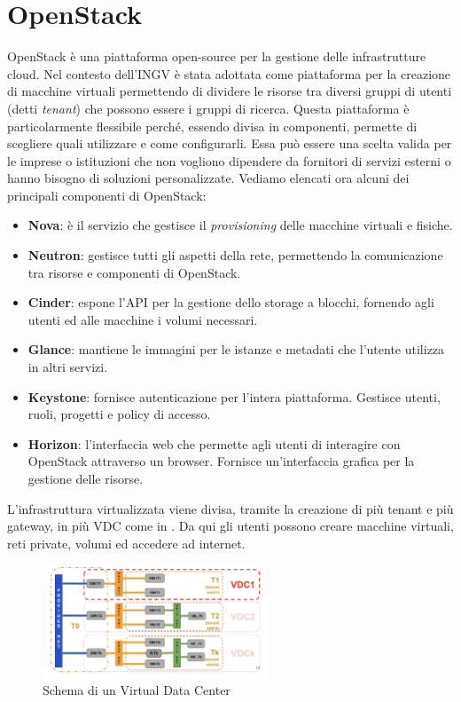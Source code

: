 \documentclass[12pt,a4paper,openright,twoside]{book}
\begin{document}
\section{OpenStack}
OpenStack è una piattaforma open-source per la gestione delle infrastrutture cloud. Nel contesto dell'INGV è stata adottata come piattaforma per la creazione di
macchine virtuali permettendo di dividere le risorse tra diversi gruppi di utenti (detti \textit{tenant}) che possono essere i gruppi di ricerca.
Questa piattaforma è particolarmente flessibile perché, essendo divisa in componenti, permette di scegliere quali utilizzare e come configurarli. Essa può essere
una scelta valida per le imprese o istituzioni che non vogliono dipendere da fornitori di servizi esterni o hanno bisogno di soluzioni personalizzate.
Vediamo elencati ora alcuni dei principali componenti di OpenStack\cite{amslaurea29330}:
\begin{itemize}
    \item \textbf{Nova}: è il servizio che gestisce il \textit{provisioning} delle macchine virtuali e fisiche. 
    \item \textbf{Neutron}: gestisce tutti gli aspetti della rete, permettendo la comunicazione tra risorse e componenti di OpenStack. 
    \item \textbf{Cinder}: espone l'API per la gestione dello storage a blocchi, fornendo agli utenti ed alle macchine i volumi necessari.
    \item \textbf{Glance}: mantiene le immagini per le istanze e metadati che l'utente utilizza in altri servizi. 
    \item \textbf{Keystone}: fornisce autenticazione per l'intera piattaforma. Gestisce utenti, ruoli, progetti e policy di accesso.
    \item \textbf{Horizon}: l'interfaccia web che permette agli utenti di interagire con OpenStack attraverso un browser. Fornisce un'interfaccia grafica per la gestione delle risorse.
\end{itemize}
L'infrastruttura virtualizzata viene divisa, tramite la creazione di più tenant e più gateway, in più VDC come in . Da qui gli utenti possono creare macchine virtuali, reti private, volumi ed
accedere ad internet.
\begin{figure}
    \centering
    \includegraphics[width=0.6\textwidth]{figures/vdc-diagram.png}
    \caption{Schema di un Virtual Data Center}
    \label{fig:vdc}
\end{figure}
\end{document}
